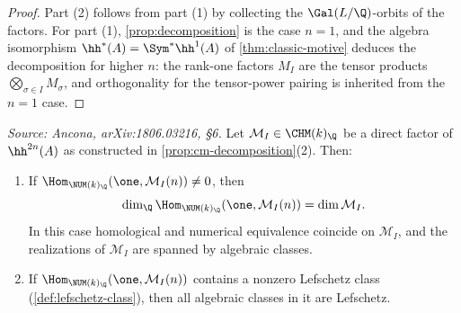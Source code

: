 \begin{proof}
  Part (2) follows from part (1) by collecting the \(\Gal(L/\Q)\)-orbits of the
  factors. For part (1), \cref{prop:decomposition} is the case \(n = 1\), and the
  algebra isomorphism \(\hh^*(A) = \Sym^* \hh^1(A)\) of \cref{thm:classic-motive}
  deduces the decomposition for higher \(n\): the rank-one factors \(M_I\) are
  the tensor products \(\bigotimes_{\sigma \in I} M_\sigma\), and orthogonality
  for the tensor-power pairing is inherited from the \(n = 1\) case.
\end{proof}

\begin{proposition}
  \label{prop:factor-algebraic}
  \textit{Source: Ancona, arXiv:1806.03216, §6.}
  Let \(\mathcal{M}_I \in \CHM(k)_{\Q}\) be a direct factor of \(\hh^{2n}(A)\) as
  constructed in \cref{prop:cm-decomposition}(2). Then:
  \begin{enumerate}
    \item If \(\Hom_{\NUM(k)_\Q}(\one, \mathcal{M}_I(n)) \neq 0\), then
      \[\dim_\Q \Hom_{\NUM(k)_\Q}(\one, \mathcal{M}_I(n)) = \dim \mathcal{M}_I.\]
      In this case homological and numerical equivalence coincide on
      \(\mathcal{M}_I\), and the realizations of \(\mathcal{M}_I\) are spanned by
      algebraic classes.
    \item If \(\Hom_{\NUM(k)_\Q}(\one, \mathcal{M}_I(n))\) contains a nonzero
      Lefschetz class (\cref{def:lefschetz-class}), then all algebraic classes in
      it are Lefschetz.
  \end{enumerate}
\end{proposition}

